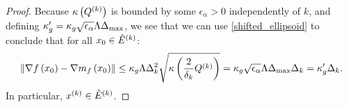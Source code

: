 \documentclass{article}
\begin{document}
\begin{proof}




Because ${\kappa} \left({Q^{(k)}}\right)$ is bounded by some $\epsilon_{\alpha} > 0$ independently of $k$,
and defining $\kappa'_{g} =  \kappa_g\sqrt{\epsilon_{\alpha}}\Lambda{\Delta_{\textrm{max}}}$, we see that
we can use  \cref{shifted_ellipsoid} to conclude that for all $x_0 \in {{\hat E}^{(k)}}$:
\begin{align*}
\left\|\nabla f\left(x_0 \right) - \nabla m_f\left(x_0\right)\right\| \le 
\kappa_g  \Lambda\Delta_k^2 \sqrt{{\kappa} \left(\frac 2 {\delta_k} Q^{(k)}\right)}
=  \kappa_g \sqrt{\epsilon_{\alpha}}\Lambda{\Delta_{\textrm{max}}}\Delta_k 
= \kappa'_g\Delta_k.
\end{align*}
In particular, $x^{(k)} \in {{\hat E}^{(k)}}$.
\end{proof}

\end{document}
